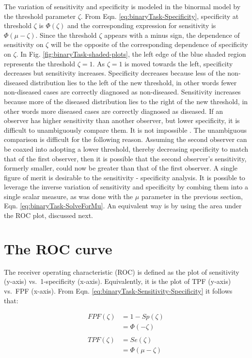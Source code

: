 \documentclass[
]{book}
\begin{document}
The variation of sensitivity and specificity is modeled in the binormal model by the threshold parameter \(\zeta\). From Eqn. \eqref{eq:binaryTask-Specificity}, specificity at threshold \(\zeta\) is \(\Phi(\zeta)\) and the corresponding expression for sensitivity is \(\Phi(\mu-\zeta)\). Since the threshold \(\zeta\) appears with a minus sign, the dependence of sensitivity on \(\zeta\) will be the opposite of the corresponding dependence of specificity on \(\zeta\). In Fig. \ref{fig:binaryTask-shaded-plots}, the left edge of the blue shaded region represents the threshold \(\zeta = 1\). As \(\zeta = 1\) is moved towards the left, specificity decreases but sensitivity increases. Specificity decreases because less of the non-diseased distribution lies to the left of the new threshold, in other words fewer non-diseased cases are correctly diagnosed as non-diseased. Sensitivity increases because more of the diseased distribution lies to the right of the new threshold, in other words more diseased cases are correctly diagnosed as diseased. If an observer has higher sensitivity than another observer, but lower specificity, it is difficult to unambiguously compare them. It is not impossible \citep{RN2637}. The unambiguous comparison is difficult for the following reason. Assuming the second observer can be coaxed into adopting a lower threshold, thereby decreasing specificity to match that of the first observer, then it is possible that the second observer's sensitivity, formerly smaller, could now be greater than that of the first observer. A single figure of merit is desirable to the sensitivity - specificity analysis. It is possible to leverage the inverse variation of sensitivity and specificity by combing them into a single scalar measure, as was done with the \(\mu\) parameter in the previous section, Eqn. \eqref{eq:binaryTask-SolveForMu}. An equivalent way is by using the area under the ROC plot, discussed next.

\hypertarget{the-roc-curve}{%
\section{The ROC curve}\label{the-roc-curve}}

The receiver operating characteristic (ROC) is defined as the plot of sensitivity (y-axis) vs.~1-specificity (x-axis). Equivalently, it is the plot of TPF (y-axis) vs.~FPF (x-axis). From Eqn. \eqref{eq:binaryTask-Sensitivity-Specificity} it follows that:

\begin{equation} 
\begin{aligned} 
FPF\left ( \zeta \right ) &= 1 - Sp\left ( \zeta \right ) \\
&=\Phi\left ( -\zeta \right )\\
\\
TPF\left ( \zeta \right ) &= Se\left ( \zeta \right ) \\
&=\Phi\left (\mu -\zeta \right )\\ 
\end{aligned} 
\label{eq:binaryTask-FPF-TPF}
\end{equation}
\end{document}
